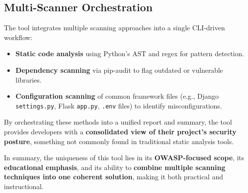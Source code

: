 \subsection{Multi-Scanner Orchestration}
The tool integrates multiple scanning approaches into a single CLI-driven workflow:
\begin{itemize}
    \item \textbf{Static code analysis} using Python’s AST and regex for pattern detection.
    \item \textbf{Dependency scanning} via pip-audit to flag outdated or vulnerable libraries.
    \item \textbf{Configuration scanning} of common framework files (e.g., Django \texttt{settings.py}, Flask \texttt{app.py}, \texttt{.env} files) to identify misconfigurations.
\end{itemize}

By orchestrating these methods into a unified report and summary, the tool provides developers with a \textbf{consolidated view of their project’s security posture}, something not commonly found in traditional static analysis tools.

\vspace{1em}
\noindent In summary, the uniqueness of this tool lies in its \textbf{OWASP-focused scope}, its \textbf{educational emphasis}, and its ability to \textbf{combine multiple scanning techniques into one coherent solution}, making it both practical and instructional.